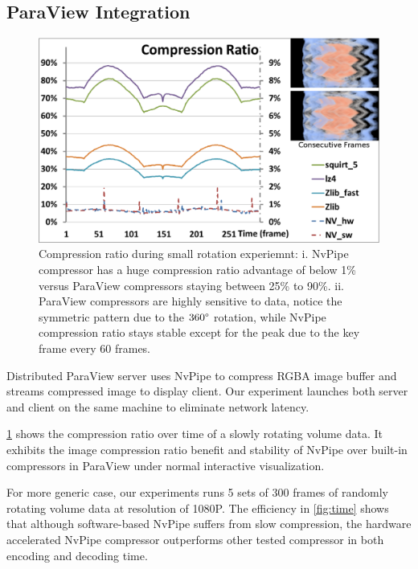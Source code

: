 \documentclass[review]{vgtc}                 %
\begin{document}
\subsection{ParaView Integration}

\begin{figure}[htb]
  \centering
  \includegraphics[width=\columnwidth]{compressRatio.eps}
  \caption{Compression ratio during small rotation experiemnt: i. NvPipe compressor has a huge compression ratio advantage of below 1\% versus ParaView compressors staying between 25\% to 90\%. ii. ParaView compressors are highly sensitive to data, notice the symmetric pattern due to the \(360\degree\) rotation, while NvPipe compression ratio stays stable except for the peak due to the key frame every 60 frames. }
  \label{fig:compressRatio}
\end{figure}

Distributed ParaView server uses NvPipe to compress RGBA image buffer and streams compressed image to display client. Our experiment launches both server and client on the same machine to eliminate network latency.

\cref{fig:compressRatio} shows the compression ratio over time of a slowly rotating volume data. It exhibits the image compression ratio benefit and stability of NvPipe over built-in compressors in ParaView under normal interactive visualization.

For more generic case, our experiments runs 5 sets of 300 frames of randomly rotating volume data at resolution of 1080P.
The efficiency in \cref{fig:time} shows that although software-based NvPipe suffers from slow compression, the hardware accelerated NvPipe compressor outperforms other tested compressor in both encoding and decoding time.
\end{document}
